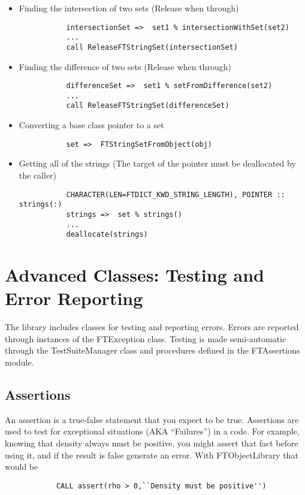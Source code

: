 \documentclass[9pt]{article}
\begin{document}
\begin{itemize}
        \item Finding the intersection of two sets (Release when through)
	{\color{blue}\begin{verbatim}
           intersectionSet =>  set1 % intersectionWithSet(set2)
           ...
           call ReleaseFTStringSet(intersectionSet)
	\end{verbatim}}
	
        \item Finding the difference of two sets (Release when through)
	{\color{blue}\begin{verbatim}
           differenceSet =>  set1 % setFromDifference(set2)
           ...
           call ReleaseFTStringSet(differenceSet)
	\end{verbatim}}

        \item Converting a base class pointer to a set
	{\color{blue}\begin{verbatim}
           set =>  FTStringSetFromObject(obj)
	\end{verbatim}}
		
        \item Getting all of the strings (The target of the pointer must be deallocated by the caller)
	{\color{blue}\begin{verbatim}
           CHARACTER(LEN=FTDICT_KWD_STRING_LENGTH), POINTER :: strings(:)
           strings =>  set % strings()
           ...
           deallocate(strings)
	\end{verbatim}}
		
\end{itemize}



\section{Advanced Classes: Testing and Error Reporting}

The library includes classes for testing and reporting errors. Errors are reported through
instances of the FTException class. Testing is made semi-automatic through the
TestSuiteManager class and procedures defined in the FTAssertions module.
\subsection{Assertions}
An assertion is a true-false statement that you expect to be true. Assertions are used
to test for exceptional situations (AKA ``Failures'') in a code. For example, knowing that density
always must be positive, you might assert that fact before using it, and if the result is false 
generate an error. With FTObjectLibrary that would be
	{\color{blue}\begin{verbatim}
        	CALL assert(rho > 0,``Density must be positive'')
	\end{verbatim}}
\end{document}
